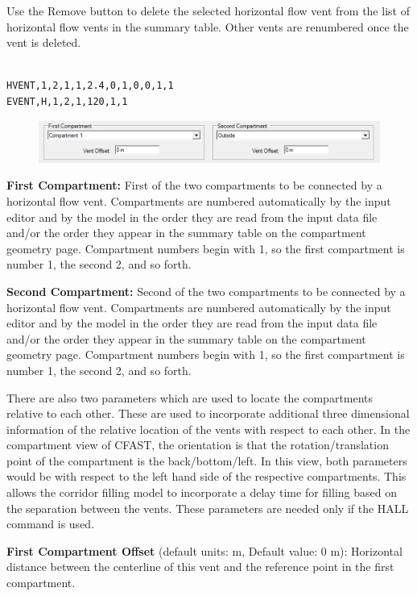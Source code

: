Use the Remove button to delete the selected horizontal flow vent from the list of horizontal flow vents in the summary table.  Other vents are renumbered once the vent is deleted. \\~ \\

\begin{lstlisting}
HVENT,1,2,1,1,2.4,0,1,0,0,1,1
EVENT,H,1,2,1,120,1,1
\end{lstlisting}

\begin{figure}[h!]
\includegraphics[width=6.5in]{FIGURES/Input_File/Compartment_From_To}
\end{figure}

\textbf{First Compartment:} First of the two compartments to be connected by a horizontal flow vent.  Compartments are numbered automatically by the input editor and by the model in the order they are read from the input data file and/or the order they appear in the summary table on the compartment geometry page. Compartment numbers begin with 1, so the first compartment is number 1, the second 2, and so forth.

\textbf{Second Compartment:} Second of the two compartments to be connected by a horizontal flow vent.  Compartments are numbered automatically by the input editor and by the model in the order they are read from the input data file and/or the order they appear in the summary table on the compartment geometry page. Compartment numbers begin with 1, so the first compartment is number 1, the second 2, and so forth.

There are also two parameters which are used to locate the compartments relative to each other. These are used to incorporate additional three dimensional information of the relative location of the vents with respect to each other. In the compartment view of CFAST, the orientation is that the rotation/translation point of the compartment is the back/bottom/left. In this view, both parameters would be with respect to the left hand side of the respective compartments. This allows the corridor filling model to incorporate a delay time for filling based on the separation between the vents. These parameters are needed only if the HALL command is used.

\textbf{First Compartment Offset} (default units: m, Default value: 0 m): Horizontal distance between the centerline of this vent and the reference point in the first compartment.

